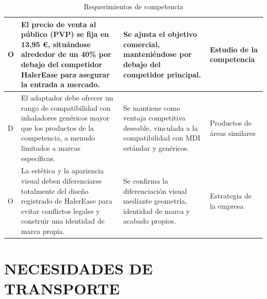 \documentclass[11pt,a4paper]{article}
\begin{document}
\begin{table}[H]
\begin{tabular}{|p{2.8cm}|p{5.5cm}|p{2.5cm}|p{3.0cm}|}
\hline
O & El precio de venta al público (PVP) se fija en 13,95 €, situándose alrededor de un 40\% por debajo del competidor HalerEase para asegurar la entrada a mercado. & Se ajusta el objetivo comercial, manteniéndose por debajo del competidor principal. & Estudio de la competencia \\
\hline
D & El adaptador debe ofrecer un rango de compatibilidad con inhaladores genéricos mayor que los productos de la competencia, a menudo limitados a marcas específicas. & Se mantiene como ventaja competitiva deseable, vinculada a la compatibilidad con MDI estándar y genéricos. & Productos de áreas similares \\
\hline
O & La estética y la apariencia visual deben diferenciarse totalmente del diseño registrado de HalerEase para evitar conflictos legales y construir una identidad de marca propia. & Se confirma la diferenciación visual mediante geometría, identidad de marca y acabado propios. & Estrategia de la empresa \\
\hline
\end{tabular}
\caption{Requerimientos de competencia}
\end{table}

\newpage

\section{NECESIDADES DE TRANSPORTE}

\vspace{0.5cm}
\end{document}
